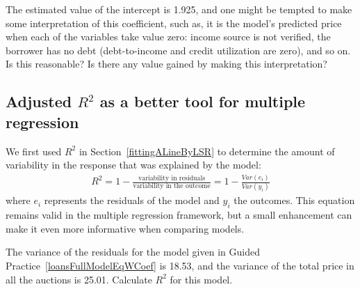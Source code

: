 \begin{exercisewrap}
\begin{nexercise}
The estimated value of the intercept is 1.925, and one might
be tempted to make some interpretation of this coefficient,
such as, it is the model's predicted price when each of the
variables take value zero: income source is not verified,
the borrower has no debt (debt-to-income and credit
utilization are zero), and so on.
Is this reasonable?
Is there any value gained by making this
interpretation?\footnotemark
\end{nexercise}
\end{exercisewrap}


\subsection{Adjusted $R^2$ as a better tool
    for multiple regression}


We first used $R^2$ in Section~\ref{fittingALineByLSR}
to determine the amount of variability in the response
that was explained by the model:
\begin{align*}
R^2 =
    1 - \frac{\text{variability in residuals}}
        {\text{variability in the outcome}}
	= 1 - \frac{Var(e_i)}{Var(y_i)}
\end{align*}
where $e_i$ represents the residuals of the model and
$y_i$ the outcomes.
This equation remains valid in the multiple regression
framework, but a small enhancement can make it even
more informative when comparing models.

\begin{exercisewrap}
\begin{nexercise}
\label{computeUnadjR2ForFullLoansModel}%
The variance of the residuals for the model given in
Guided Practice~\ref{loansFullModelEqWCoef}
is 18.53, and the variance of the total price in all
the auctions is 25.01.
Calculate $R^2$ for this model.\footnotemark
\end{nexercise}
\end{exercisewrap}

